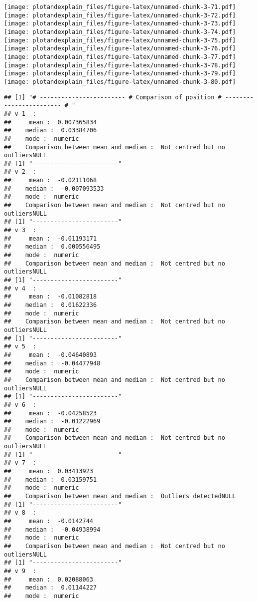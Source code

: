 \documentclass[]{article}
\begin{document}
\texttt{[image: plotandexplain\_files/figure-latex/unnamed-chunk-3-71.pdf]}
\texttt{[image: plotandexplain\_files/figure-latex/unnamed-chunk-3-72.pdf]}
\texttt{[image: plotandexplain\_files/figure-latex/unnamed-chunk-3-73.pdf]}
\texttt{[image: plotandexplain\_files/figure-latex/unnamed-chunk-3-74.pdf]}
\texttt{[image: plotandexplain\_files/figure-latex/unnamed-chunk-3-75.pdf]}
\texttt{[image: plotandexplain\_files/figure-latex/unnamed-chunk-3-76.pdf]}
\texttt{[image: plotandexplain\_files/figure-latex/unnamed-chunk-3-77.pdf]}
\texttt{[image: plotandexplain\_files/figure-latex/unnamed-chunk-3-78.pdf]}
\texttt{[image: plotandexplain\_files/figure-latex/unnamed-chunk-3-79.pdf]}
\texttt{[image: plotandexplain\_files/figure-latex/unnamed-chunk-3-80.pdf]}

\begin{verbatim}
## [1] "# ------------------------ # Comparison of position # ------------------------ # "
## v 1  : 
##     mean :  0.007365834 
##    median :  0.03384706 
##    mode :  numeric 
##    Comparison between mean and median :  Not centred but no outliersNULL
## [1] "------------------------"
## v 2  : 
##     mean :  -0.02111068 
##    median :  -0.007093533 
##    mode :  numeric 
##    Comparison between mean and median :  Not centred but no outliersNULL
## [1] "------------------------"
## v 3  : 
##     mean :  -0.01193171 
##    median :  0.000556495 
##    mode :  numeric 
##    Comparison between mean and median :  Not centred but no outliersNULL
## [1] "------------------------"
## v 4  : 
##     mean :  -0.01082818 
##    median :  0.01622336 
##    mode :  numeric 
##    Comparison between mean and median :  Not centred but no outliersNULL
## [1] "------------------------"
## v 5  : 
##     mean :  -0.04640893 
##    median :  -0.04477948 
##    mode :  numeric 
##    Comparison between mean and median :  Not centred but no outliersNULL
## [1] "------------------------"
## v 6  : 
##     mean :  -0.04258523 
##    median :  -0.01222969 
##    mode :  numeric 
##    Comparison between mean and median :  Not centred but no outliersNULL
## [1] "------------------------"
## v 7  : 
##     mean :  0.03413923 
##    median :  0.03159751 
##    mode :  numeric 
##    Comparison between mean and median :  Outliers detectedNULL
## [1] "------------------------"
## v 8  : 
##     mean :  -0.0142744 
##    median :  -0.04938994 
##    mode :  numeric 
##    Comparison between mean and median :  Not centred but no outliersNULL
## [1] "------------------------"
## v 9  : 
##     mean :  0.02088063 
##    median :  0.01144227 
##    mode :  numeric 

\end{verbatim}
\end{document}
